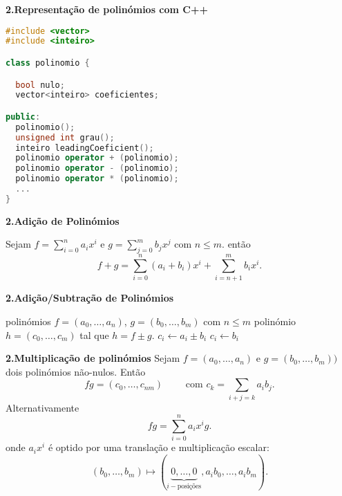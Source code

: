 \documentclass{beamer}
\begin{document}
\begin{frame}[fragile]{\bf 2.}{\bf Representação de polinómios com C++}

\begin{lstlisting}[language=C++]
#include <vector>
#include <inteiro>

class polinomio {

  bool nulo;
  vector<inteiro> coeficientes;

public:
  polinomio();
  unsigned int grau();
  inteiro leadingCoeficient();
  polinomio operator + (polinomio);
  polinomio operator - (polinomio);
  polinomio operator * (polinomio);
  ...
}

\end{lstlisting}
\end{frame}


\begin{frame}{\bf 2.}{\bf Adição de Polinómios}

Sejam $f=\sum_{i=0}^n a_i x^i$ e $g=\sum_{j=0}^m b_j x^j$ com $n\leq m$. então 
$$f+g = \sum_{i=0}^n (a_i+b_i) x^i  + \sum_{i=n+1}^m b_i x^i .$$
\end{frame}




\begin{frame}[fragile]{\bf 2.}{\bf Adição/Subtração de Polinómios}
\begin{algorithmic}
\REQUIRE polinómios $f=(a_0,\ldots, a_n)$, $g=(b_0,\ldots, b_m)$ com $n\leq m$
\ENSURE polinómio $h=(c_0, \ldots, c_m)$ tal que $h=f\pm g$.
  \STATE $c_i \leftarrow a_i\pm b_i$
\ENDFOR
{}
  \STATE $c_i \leftarrow b_i$
\ENDFOR
\end{algorithmic}

\end{frame}




\begin{frame}{\bf 2.}{\bf Multiplicação de polinómios}
Sejam $f=(a_0,\ldots, a_n)$ e $g=(b_0,\ldots, b_m))$ dois polinómios não-nulos.
Então
$$ fg = (c_0, \ldots, c_{nm}) \qquad \mbox{ com } c_k=\sum_{i+j=k}a_i b_j .$$
\pause Alternativamente 
$$ fg = \sum_{i=0}^n a_ix^ig.$$
onde $a_ix^i$ é optido por uma translação e multiplicação escalar: 
$$(b_0,\ldots, b_m) \mapsto (\underbrace{0,\ldots, 0}_{i-\mbox{posições}},a_ib_0,\ldots, a_ib_m).$$
\end{frame}
\end{document}
